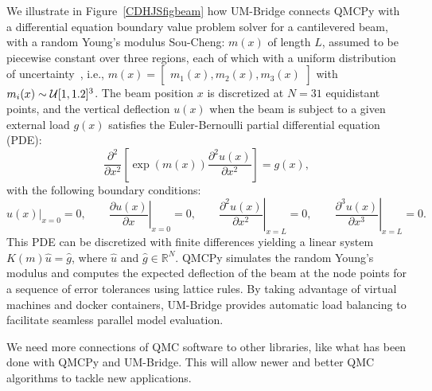 \documentclass[graybox]{svmult}
\newcommand{\SCComment}[1]{{\color{green} Sou-Cheng: #1}}
\begin{document}
We illustrate in Figure~\ref{CDHJSfigbeam} how UM-Bridge connects QMCPy with a differential equation boundary value problem solver for a cantilevered beam, with a random Young's modulus \SCComment{$m(x)$ of length $L$, assumed to be piecewise constant over three regions, each of which with a uniform distribution of uncertainty~\cite{ParSee22a}, i.e., $m(x) = \left[\begin{matrix} m_1(x), m_2(x), m_3(x) \end{matrix} \right]$ with $m_i(x) \sim {\mathcal{U}}[1,1.2]^3$.  The beam position $x$ is discretized at $N=31$ equidistant points, and 
the vertical deflection $u(x)$ when the beam is subject to a given external load  $g(x)$ satisfies the Euler-Bernoulli partial differential equation (PDE):
$$ \frac{\partial^2}{\partial x^2}\left[ \exp(m(x)) \frac{\partial^2  u(x)}{\partial x^2}\right] = g(x),$$
with the following boundary conditions:
$$ \left.u(x)\right|_{x=0} = 0, \qquad 
\left.\frac{\partial u(x)}{\partial x}\right|_{x=0} = 0, \qquad
\left.\frac{\partial^2 u(x)}{\partial x^2}\right|_{x=L} = 0, \qquad  \left.\frac{\partial^3 u(x)}{\partial x^3}\right|_{x=L} = 0. $$
This PDE can be discretized with finite differences yielding a linear system $K(m) \hat{u} = \hat{g}$, where $\hat{u}$ and $\hat{g} \in \mathbb{R}^N$. }
QMCPy simulates the random Young's modulus and computes the expected deflection of the beam at the node points for a sequence of error tolerances using lattice rules.  By taking advantage of virtual machines and docker containers, UM-Bridge provides automatic load balancing to facilitate seamless parallel model evaluation.%




We need more connections of QMC software to other libraries, like what has been done with  QMCPy and UM-Bridge.  This will allow newer and better QMC algorithms to tackle new applications.
\end{document}
